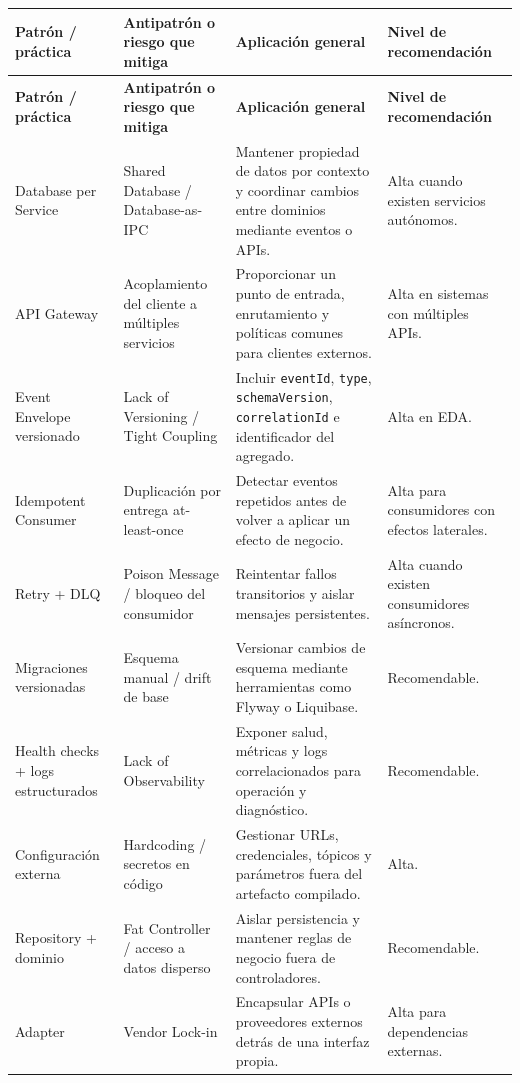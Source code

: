 \documentclass[12pt,a4paper]{article}
\begin{document}
\scriptsize
\setlength{\tabcolsep}{3pt}
\begin{longtable}{P{0.18\textwidth} P{0.20\textwidth} P{0.34\textwidth} P{0.17\textwidth}}
\toprule
\textbf{Patrón / práctica} & \textbf{Antipatrón o riesgo que mitiga} & \textbf{Aplicación general} & \textbf{Nivel de recomendación} \\
\midrule
\endfirsthead
\toprule
\textbf{Patrón / práctica} & \textbf{Antipatrón o riesgo que mitiga} & \textbf{Aplicación general} & \textbf{Nivel de recomendación} \\
\midrule
\endhead
Database per Service & Shared Database / Database-as-IPC & Mantener propiedad de datos por contexto y coordinar cambios entre dominios mediante eventos o APIs. & Alta cuando existen servicios autónomos. \\
API Gateway & Acoplamiento del cliente a múltiples servicios & Proporcionar un punto de entrada, enrutamiento y políticas comunes para clientes externos. & Alta en sistemas con múltiples APIs. \\
Event Envelope versionado & Lack of Versioning / Tight Coupling & Incluir \texttt{eventId}, \texttt{type}, \texttt{schemaVersion}, \texttt{correlationId} e identificador del agregado. & Alta en EDA. \\
Idempotent Consumer & Duplicación por entrega at-least-once & Detectar eventos repetidos antes de volver a aplicar un efecto de negocio. & Alta para consumidores con efectos laterales. \\
Retry + DLQ & Poison Message / bloqueo del consumidor & Reintentar fallos transitorios y aislar mensajes persistentes. & Alta cuando existen consumidores asíncronos. \\
Migraciones versionadas & Esquema manual / drift de base & Versionar cambios de esquema mediante herramientas como Flyway o Liquibase. & Recomendable. \\
Health checks + logs estructurados & Lack of Observability & Exponer salud, métricas y logs correlacionados para operación y diagnóstico. & Recomendable. \\
Configuración externa & Hardcoding / secretos en código & Gestionar URLs, credenciales, tópicos y parámetros fuera del artefacto compilado. & Alta. \\
Repository + dominio & Fat Controller / acceso a datos disperso & Aislar persistencia y mantener reglas de negocio fuera de controladores. & Recomendable. \\
Adapter & Vendor Lock-in & Encapsular APIs o proveedores externos detrás de una interfaz propia. & Alta para dependencias externas. \\

\end{longtable}
\end{document}
